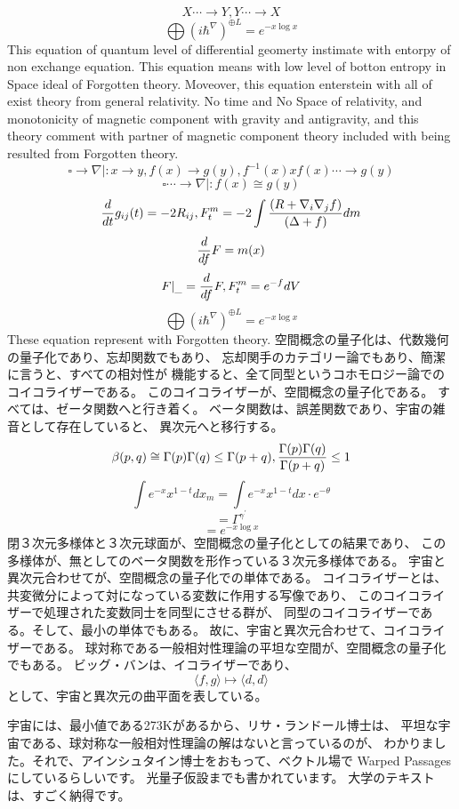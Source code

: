 \documentclass{jsarticle}
\begin{document}
{   $$ X \dotsi \to Y, Y \dotsi \to X $$
   $$ \bigoplus(i \hbar^{\nabla})^{\oplus L} = e^{-x \log x} $$
   This equation of quantum level of differential geomerty
   instimate with entorpy of non exchange equation.
   This equation means with low level of botton entropy in Space ideal of
   Forgotten theory. Moveover, this equation enterstein with all of exist
   theory from general relativity.
   No time and No Space of relativity, and monotonicity of magnetic component
   with gravity and antigravity, and this theory comment with partner of
   magnetic component theory included with being resulted from Forgotten
   theory.
   $$ \square \to \nabla |: x \to y, f(x) \to g(y), f^{-1}(x)xf(x) 
   \dotsi \to g(y) $$
   $$ \square \dotsi \to \nabla |: f(x) \cong g(y) $$
   $$ {d \over dt}g_{ij}(t) = - 2 R_{ij}, F^m_t = -2\int{{(R + \nabla_i \nabla
   _j f)} \over {(\Delta + f)}}dm $$
   $$ {d \over df}F = m(x) $$
   $$ F|_{\_} = {d \over df}F, F^m_t = e^{-f}dV $$
   $$ \bigoplus(i \hbar^{\nabla})^{\oplus L} = e^{-x \log x} $$
   These equation represent with Forgotten theory.
   空間概念の量子化は、代数幾何の量子化であり、忘却関数でもあり、
   忘却関手のカテゴリー論でもあり、簡潔に言うと、すべての相対性が
   機能すると、全て同型というコホモロジー論でのコイコライザーである。
   このコイコライザーが、空間概念の量子化である。
   すべては、ゼータ関数へと行き着く。
   ベータ関数は、誤差関数であり、宇宙の雑音として存在していると、
   異次元へと移行する。
   $$ \beta(p,q) \cong {\Gamma(p)\Gamma(q) \le \Gamma(p+q)}, 
   {{\Gamma(p)\Gamma(q)} \over \Gamma(p+q)} \le 1 $$
   $$ \int e^{-x}x^{1-t}dx_m = \int e^{-x}x^{1-t}dx\cdot e^{-\theta} $$
   $$ = \Gamma^{{\gamma}^{'}} $$
   $$ = e^{-x \log x} $$
   閉３次元多様体と３次元球面が、空間概念の量子化としての結果であり、
   この多様体が、無としてのベータ関数を形作っている３次元多様体である。
   宇宙と異次元合わせてが、空間概念の量子化での単体である。
   コイコライザーとは、共変微分によって対になっている変数に作用する写像であり、
   このコイコライザーで処理された変数同士を同型にさせる群が、
   同型のコイコライザーである。そして、最小の単体でもある。
   故に、宇宙と異次元合わせて、コイコライザーである。
   球対称である一般相対性理論の平坦な空間が、空間概念の量子化でもある。
   ビッグ・バンは、イコライザーであり、
   $$ \langle f,g\rangle \mapsto \langle d,d\rangle $$
   として、宇宙と異次元の曲平面を表している。

   宇宙には、最小値である273Kがあるから、リサ・ランドール博士は、
   平坦な宇宙である、球対称な一般相対性理論の解はないと言っているのが、
   わかりました。それで、アインシュタイン博士をおもって、ベクトル場で
   Warped Passagesにしているらしいです。
   光量子仮設までも書かれています。
   大学のテキストは、すごく納得です。


}
\end{document}
